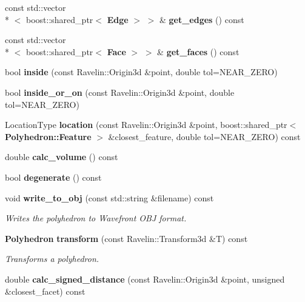 \begin{DoxyCompactItemize}
\item 
const std\-::vector\\*
$<$ boost\-::shared\-\_\-ptr$<$ {\bf Edge} $>$ $>$ \& {\bfseries get\-\_\-edges} () const \label{classMoby_1_1Polyhedron_ad3c45794cf83d79fb425d667e571f4a9}

\item 
const std\-::vector\\*
$<$ boost\-::shared\-\_\-ptr$<$ {\bf Face} $>$ $>$ \& {\bfseries get\-\_\-faces} () const \label{classMoby_1_1Polyhedron_a2a2974b6fa0f1c42fdaa3267f6ab2c1b}

\item 
bool {\bfseries inside} (const Ravelin\-::\-Origin3d \&point, double tol=N\-E\-A\-R\-\_\-\-Z\-E\-R\-O)\label{classMoby_1_1Polyhedron_a9da6cd5a5dbf85e81a1c3c218d7d9112}

\item 
bool {\bfseries inside\-\_\-or\-\_\-on} (const Ravelin\-::\-Origin3d \&point, double tol=N\-E\-A\-R\-\_\-\-Z\-E\-R\-O)\label{classMoby_1_1Polyhedron_a1c0701c018cb23aca27a6eef2752f3cc}

\item 
Location\-Type {\bfseries location} (const Ravelin\-::\-Origin3d \&point, boost\-::shared\-\_\-ptr$<$ {\bf Polyhedron\-::\-Feature} $>$ \&closest\-\_\-feature, double tol=N\-E\-A\-R\-\_\-\-Z\-E\-R\-O) const \label{classMoby_1_1Polyhedron_a1079176623c9cce5d821f528c6397c28}

\item 
double {\bfseries calc\-\_\-volume} () const \label{classMoby_1_1Polyhedron_a9b96a5f4b186cbaed6d38d8470ee52db}

\item 
bool {\bfseries degenerate} () const \label{classMoby_1_1Polyhedron_a8341c94887c6f4489ecbb0954394e2a5}

\item 
void {\bf write\-\_\-to\-\_\-obj} (const std\-::string \&filename) const \label{classMoby_1_1Polyhedron_aad211929a05398f8df28f932c7a73888}

\begin{DoxyCompactList}\small\item\em Writes the polyhedron to Wavefront O\-B\-J format. \end{DoxyCompactList}\item 
{\bf Polyhedron} {\bf transform} (const Ravelin\-::\-Transform3d \&T) const \label{classMoby_1_1Polyhedron_a2d054dfef9a6039cc661e5ebe9a1f100}

\begin{DoxyCompactList}\small\item\em Transforms a polyhedron. \end{DoxyCompactList}\item 
double {\bf calc\-\_\-signed\-\_\-distance} (const Ravelin\-::\-Origin3d \&point, unsigned \&closest\-\_\-facet) const \label{classMoby_1_1Polyhedron_a75fe654af8a515961ee498115b7f9bfc}


\end{DoxyCompactItemize}
